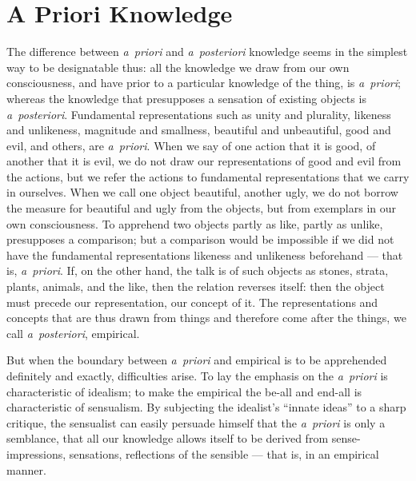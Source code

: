 \documentclass[12pt]{book}
\begin{document}
\section{A Priori Knowledge}
\label{sec:4}

\noindent The difference between \textit{a~priori} and \textit{a~posteriori}
knowledge seems in the simplest way to be designatable thus: all the
knowledge we draw from our own consciousness, and have prior to a particular
knowledge of the thing, is \textit{a~priori}; whereas the knowledge that
presupposes a sensation of existing objects is \textit{a~posteriori}.
Fundamental representations such as unity and plurality, likeness and
unlikeness, magnitude and smallness, beautiful and unbeautiful, good and
evil, and others, are \textit{a~priori}. When we say of one action that it is
good, of another that it is evil, we do not draw our representations of good
and evil from the actions, but we refer the actions to fundamental
representations that we carry in ourselves. When we call one object beautiful,
another ugly, we do not borrow the measure for beautiful and ugly from the
objects, but from exemplars in our own consciousness. To apprehend two objects
partly as like, partly as unlike, presupposes a comparison; but a comparison
would be impossible if we did not have the fundamental representations likeness
and unlikeness beforehand --- that is, \textit{a~priori}. If, on the other
hand, the talk is of such objects as stones, strata, plants, animals, and the
like, then the relation reverses itself: then the object must precede our
representation, our concept of it. The representations and concepts that are
thus drawn from things and therefore come after the things, we call
\textit{a~posteriori}, empirical.

But when the boundary between \textit{a~priori} and empirical is to be
apprehended definitely and exactly, difficulties arise. To lay the emphasis on
the \textit{a~priori} is characteristic of idealism; to make the empirical the
be-all and end-all is characteristic of sensualism. By subjecting the
idealist's ``innate ideas'' to a sharp critique, the sensualist can easily
persuade himself that the \textit{a~priori} is only a semblance, that all our
knowledge allows itself to be derived from sense-impressions, sensations,
reflections of the sensible --- that is, in an empirical manner.
\end{document}
